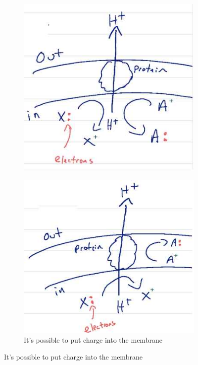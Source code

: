 \documentclass[]{article}
\begin{document}
\begin{figure}[H]
\begin{subfigure}[t]{0.3\textwidth}
		\includegraphics[width=\textwidth]{ProtonPump2}
	\end{subfigure}
	\;
	\begin{subfigure}[t]{0.3\textwidth}
		\caption{It’s possible to put charge into the membrane}\label{fig:ProtonPump3}
		\includegraphics[width=\textwidth]{ProtonPump3}
	\end{subfigure}
\end{figure}
\end{document}
